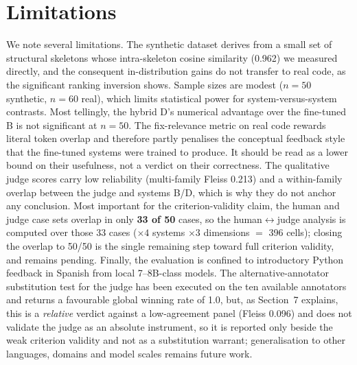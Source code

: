 \documentclass[sageh]{sagej}
\begin{document}
\section{Limitations}
We note several limitations. The synthetic dataset derives from a small set of structural skeletons whose intra-skeleton cosine similarity (0.962) we measured directly, and the consequent in-distribution gains do not transfer to real code, as the significant ranking inversion shows. Sample sizes are modest ($n=50$ synthetic, $n=60$ real), which limits statistical power for system-versus-system contrasts. Most tellingly, the hybrid D's numerical advantage over the fine-tuned B is not significant at $n=50$. The fix-relevance metric on real code rewards literal token overlap and therefore partly penalises the conceptual feedback style that the fine-tuned systems were trained to produce. It should be read as a lower bound on their usefulness, not a verdict on their correctness. The qualitative judge scores carry low reliability (multi-family Fleiss 0.213) and a within-family overlap between the judge and systems B/D, which is why they do not anchor any conclusion. Most important for the criterion-validity claim, the human and judge case sets overlap in only \textbf{33 of 50} cases, so the human$\leftrightarrow$judge analysis is computed over those 33 cases ($\times4$ systems $\times3$ dimensions $=$ 396 cells); closing the overlap to 50/50 is the single remaining step toward full criterion validity, and remains pending. Finally, the evaluation is confined to introductory Python feedback in Spanish from local 7--8B-class models. The alternative-annotator substitution test for the judge\cite{calderon2025alttest} has been executed on the ten available annotators and returns a favourable global winning rate of 1.0, but, as Section~7 explains, this is a \emph{relative} verdict against a low-agreement panel (Fleiss 0.096) and does not validate the judge as an absolute instrument, so it is reported only beside the weak criterion validity and not as a substitution warrant; generalisation to other languages, domains and model scales remains future work.

\end{document}
